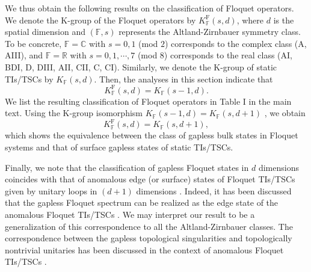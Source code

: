 \documentclass[
floatfix,
pra,
twocolumn,
reprint,
amsmath,amssymb,
aps,
footnote,
]{revtex4}
\begin{document}
We thus obtain the following results on the classification of Floquet operators. We denote the K-group of the Floquet operators by $K^{\mathrm{F}}_\mathbb{F}(s,d)$, where $d$ is the spatial dimension and $(\mathbb{F},s)$ represents the Altland-Zirnbauer symmetry class. To be concrete, $\mathbb{F}=\mathbb{C}$ with $s=0,1$ (mod $2$) corresponds to the complex class (A, AIII), and $\mathbb{F}=\mathbb{R}$ with $s=0,1,\cdots,7$ (mod $8$) corresponds to the real class (AI, BDI, D, DIII, AII, CII, C, CI).
Similarly, we denote the K-group of static TIs/TSCs by $K_\mathbb{F}(s,d)$. Then, the analyses in this section indicate that
\begin{equation}
K^{\mathrm{F}}_\mathbb{F}(s,d)=K_\mathbb{F}(s-1,d).
\end{equation}
We list the resulting classification of Floquet operators in Table I in the main text. Using the K-group isomorphism $K_\mathbb{F}(s-1,d)=K_\mathbb{F}(s,d+1)$ \cite{Kitaev09, TeoKane10}, we obtain
\begin{equation}
K^{\mathrm{F}}_\mathbb{F}(s,d)=K_\mathbb{F}(s,d+1),
\end{equation}
which shows the equivalence between the class of gapless bulk states in Floquet systems and that of surface gapless states of static TIs/TSCs.

Finally, we note that the classification of gapless Floquet states in $d$ dimensions coincides with that of anomalous edge (or surface) states of Floquet TIs/TSCs given by unitary loops in $(d+1)$ dimensions \cite{RoyHarper17}. Indeed, it has been discussed that the gapless Floquet spectrum can be realized as the edge state of the anomalous Floquet TIs/TSCs \cite{Rudner13}. We may interpret our result to be a generalization of this correspondence to all the Altland-Zirnbauer classes. The correspondence between the gapless topological singularities and topologically nontrivial unitaries has been discussed in the context of anomalous Floquet TIs/TSCs \cite{NathanRudner15, RoyHarper17}.












%
\end{document}
